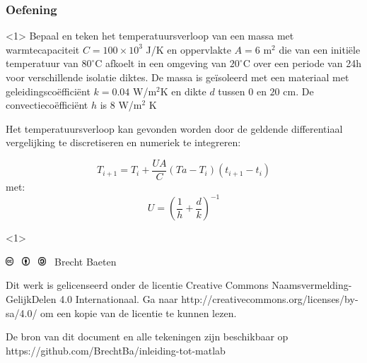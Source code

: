 \documentclass[t]{beamer}
\begin{document}
\begin{frame}
	\frametitle{Oefening}
	\begin{onlyenv}
	Bepaal en teken het temperatuursverloop van een massa met warmtecapaciteit $C=100 \times 10^3$ J/K en oppervlakte $A = 6$ m$^2$ die van een initiële temperatuur van $80^\circ$C afkoelt in een omgeving van $20^\circ$C over een periode van 24h voor verschillende isolatie diktes. De massa is geïsoleerd met een materiaal met geleidingscoëfficiënt $k = 0.04$ W/m$^2$K en dikte $d$ tussen $0$ en $20$ cm. De convectiecoëfficiënt $h$ is $8$ W/m$^2$ K

	\vspace{0.5cm}
Het temperatuursverloop kan gevonden worden door de geldende differentiaal vergelijking te discretiseren en numeriek te integreren:

\begin{equation}
	T_{i+1} = T_{i} + \frac{U A}{C} (Ta-T_{i}) (t_{i+1}-t_{i})
\end{equation}	
met:
\begin{equation}
	U = \left(\frac{1}{h} + \frac{d}{k} \right)^{-1}
\end{equation}
	
	\end{onlyenv}
	\begin{onlyenv}
		
	\end{onlyenv}
\end{frame}  	
\begin{frame}
	\footnotesize
	\vspace{4cm}
	\includegraphics[height=0.3cm]{fig/cc} \
	\includegraphics[height=0.3cm]{fig/by} \
	\includegraphics[height=0.3cm]{fig/sa}
	\quad \the\year\ Brecht Baeten
	\vspace{0.5cm}
	
    Dit werk is gelicenseerd onder de licentie Creative Commons Naamsvermelding-GelijkDelen 4.0 Internationaal. Ga naar http://creativecommons.org/licenses/by-sa/4.0/ om een kopie van de licentie te kunnen lezen.
    	
    \vspace{0.5cm}
    De bron van dit document en alle tekeningen zijn beschikbaar op https://github.com/BrechtBa/inleiding-tot-matlab
\end{frame}
\end{document}
